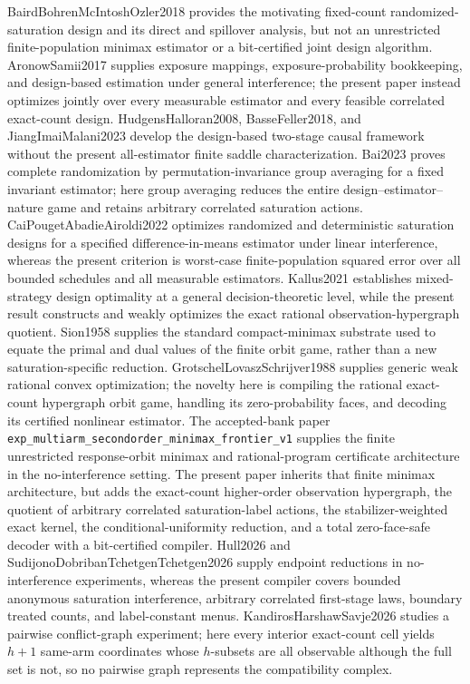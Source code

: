 \documentclass{article}
\begin{document}
BairdBohrenMcIntoshOzler2018 provides the motivating fixed-count randomized-saturation design and its direct and spillover analysis, but not an unrestricted finite-population minimax estimator or a bit-certified joint design algorithm. AronowSamii2017 supplies exposure mappings, exposure-probability bookkeeping, and design-based estimation under general interference; the present paper instead optimizes jointly over every measurable estimator and every feasible correlated exact-count design. HudgensHalloran2008, BasseFeller2018, and JiangImaiMalani2023 develop the design-based two-stage causal framework without the present all-estimator finite saddle characterization. Bai2023 proves complete randomization by permutation-invariance group averaging for a fixed invariant estimator; here group averaging reduces the entire design--estimator--nature game and retains arbitrary correlated saturation actions. CaiPougetAbadieAiroldi2022 optimizes randomized and deterministic saturation designs for a specified difference-in-means estimator under linear interference, whereas the present criterion is worst-case finite-population squared error over all bounded schedules and all measurable estimators. Kallus2021 establishes mixed-strategy design optimality at a general decision-theoretic level, while the present result constructs and weakly optimizes the exact rational observation-hypergraph quotient. Sion1958 supplies the standard compact-minimax substrate used to equate the primal and dual values of the finite orbit game, rather than a new saturation-specific reduction. GrotschelLovaszSchrijver1988 supplies generic weak rational convex optimization; the novelty here is compiling the rational exact-count hypergraph orbit game, handling its zero-probability faces, and decoding its certified nonlinear estimator. The accepted-bank paper \texttt{exp\_multiarm\_secondorder\_minimax\_frontier\_v1} supplies the finite unrestricted response-orbit minimax and rational-program certificate architecture in the no-interference setting. The present paper inherits that finite minimax architecture, but adds the exact-count higher-order observation hypergraph, the quotient of arbitrary correlated saturation-label actions, the stabilizer-weighted exact kernel, the conditional-uniformity reduction, and a total zero-face-safe decoder with a bit-certified compiler. Hull2026 and SudijonoDobribanTchetgenTchetgen2026 supply endpoint reductions in no-interference experiments, whereas the present compiler covers bounded anonymous saturation interference, arbitrary correlated first-stage laws, boundary treated counts, and label-constant menus. KandirosHarshawSavje2026 studies a pairwise conflict-graph experiment; here every interior exact-count cell yields \(h+1\) same-arm coordinates whose \(h\)-subsets are all observable although the full set is not, so no pairwise graph represents the compatibility complex.
\end{document}
